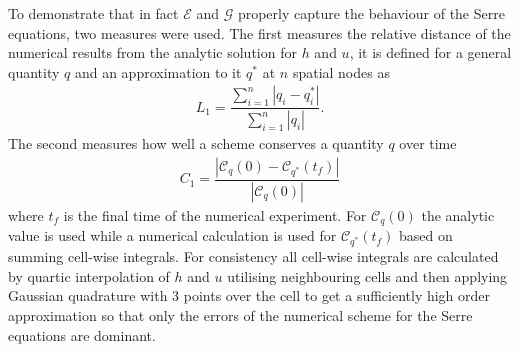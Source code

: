 \documentclass[SingleSpace,12pt,Journal]{Serre_ASCE}
\begin{document}
To demonstrate that in fact $\mathcal{E}$ and $\mathcal{G}$ properly capture the behaviour of the Serre equations, two measures were used. The first measures the relative distance of the numerical results from the analytic solution for $h$ and $u$, it is defined for a general quantity $q$ and an approximation to it $q^*$ at $n$ spatial nodes as
\begin{gather*}
L_1 = \dfrac{\sum_{i = 1}^{n} \left| q_i - q^*_i\right|}{\sum_{i = 1}^{n} \left| q_i\right|}.
\end{gather*}
The second measures how well a scheme conserves a quantity $q$ over time
\begin{gather*}
C_1 = \dfrac{\left| \mathcal{C}_{q}(0) - \mathcal{C}_{q^*}(t_f) \right|}{\left| \mathcal{C}_{q}(0) \right|}
\end{gather*}
where $t_f$ is the final time of the numerical experiment. For $\mathcal{C}_{q}(0)$ the analytic value is used while a numerical calculation is used for $\mathcal{C}_{q^*}(t_f)$ based on summing cell-wise integrals. For consistency all cell-wise integrals are calculated by quartic interpolation of $h$ and $u$ utilising neighbouring cells and then applying Gaussian quadrature with 3 points over the cell to get a sufficiently high order approximation so that only the errors of the numerical scheme for the Serre equations are dominant. 
%
\end{document}
